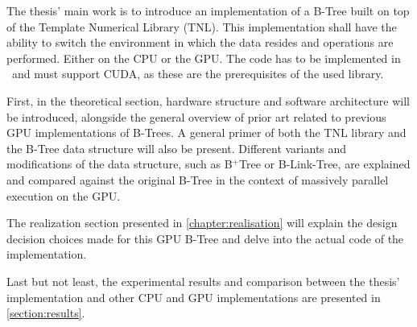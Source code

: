 The thesis' main work is to introduce an implementation of a B-Tree built on top of the Template Numerical Library (TNL). This implementation shall have the ability to switch the environment in which the data resides and operations are performed. Either on the CPU or the GPU. The code has to be implemented in \CC\ and must support CUDA, as these are the prerequisites of the used library.

First, in the theoretical section, hardware structure and software architecture will be introduced, alongside the general overview of prior art related to previous GPU implementations of B-Trees. A general primer of both the TNL library and the B-Tree data structure will also be present. Different variants and modifications of the data structure, such as B$^+$Tree or B-Link-Tree, are explained and compared against the original B-Tree in the context of massively parallel execution on the GPU.

The realization section presented in \cref{chapter:realisation} will explain the design decision choices made for this GPU B-Tree and delve into the actual code of the implementation.

Last but not least, the experimental results and comparison between the thesis' implementation and other CPU and GPU implementations are presented in \cref{section:results}.